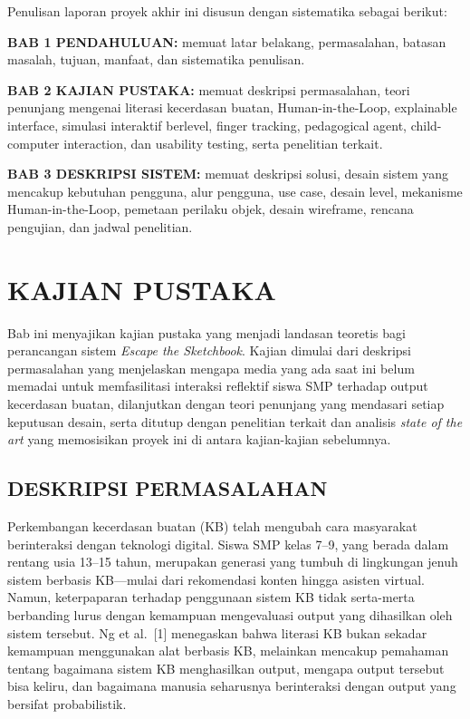 \documentclass[12pt,oneside]{report}
\begin{document}
Penulisan laporan proyek akhir ini disusun dengan sistematika sebagai berikut:

\textbf{BAB 1 PENDAHULUAN:} memuat latar belakang, permasalahan, batasan masalah, tujuan, manfaat, dan sistematika penulisan.

\textbf{BAB 2 KAJIAN PUSTAKA:} memuat deskripsi permasalahan, teori penunjang mengenai literasi kecerdasan buatan, Human-in-the-Loop, explainable interface, simulasi interaktif berlevel, finger tracking, pedagogical agent, child-computer interaction, dan usability testing, serta penelitian terkait.

\textbf{BAB 3 DESKRIPSI SISTEM:} memuat deskripsi solusi, desain sistem yang mencakup kebutuhan pengguna, alur pengguna, use case, desain level, mekanisme Human-in-the-Loop, pemetaan perilaku objek, desain wireframe, rencana pengujian, dan jadwal penelitian.


\chapter{KAJIAN PUSTAKA}
\label{chap:bab2}

Bab ini menyajikan kajian pustaka yang menjadi landasan teoretis bagi perancangan sistem \textit{Escape the Sketchbook}. Kajian dimulai dari deskripsi permasalahan yang menjelaskan mengapa media yang ada saat ini belum memadai untuk memfasilitasi interaksi reflektif siswa SMP terhadap output kecerdasan buatan, dilanjutkan dengan teori penunjang yang mendasari setiap keputusan desain, serta ditutup dengan penelitian terkait dan analisis \textit{state of the art} yang memosisikan proyek ini di antara kajian-kajian sebelumnya.

\section{DESKRIPSI PERMASALAHAN}
\label{sec:deskripsi-permasalahan-bab2}

Perkembangan kecerdasan buatan (KB) telah mengubah cara masyarakat berinteraksi dengan teknologi digital. Siswa SMP kelas 7--9, yang berada dalam rentang usia 13--15 tahun, merupakan generasi yang tumbuh di lingkungan jenuh sistem berbasis KB---mulai dari rekomendasi konten hingga asisten virtual. Namun, keterpaparan terhadap penggunaan sistem KB tidak serta-merta berbanding lurus dengan kemampuan mengevaluasi output yang dihasilkan oleh sistem tersebut. Ng et al.\ [1] menegaskan bahwa literasi KB bukan sekadar kemampuan menggunakan alat berbasis KB, melainkan mencakup pemahaman tentang bagaimana sistem KB menghasilkan output, mengapa output tersebut bisa keliru, dan bagaimana manusia seharusnya berinteraksi dengan output yang bersifat probabilistik.
\end{document}

